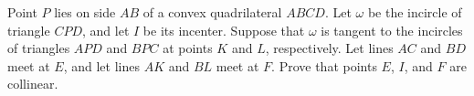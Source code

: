 Point $ P$ lies on side $ AB$ of a convex quadrilateral $ ABCD$. Let $ \omega$ be the incircle of triangle $ CPD$,  and let $ I$ be its incenter. Suppose that $ \omega$ is tangent to the incircles of triangles $ APD$ and $ BPC$ at points $ K$ and $ L$,  respectively. Let lines $ AC$ and $ BD$ meet at $ E$,  and let lines $ AK$ and $ BL$ meet at $ F$. Prove that points $ E$,  $ I$,  and $ F$ are collinear.